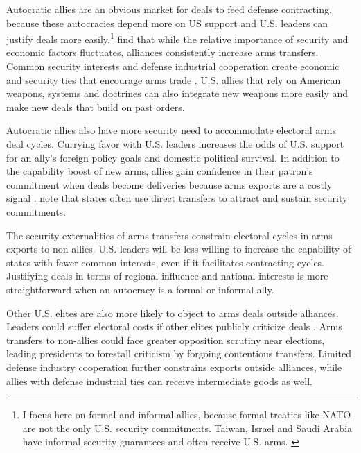 \documentclass[12pt]{article}
\begin{document}
Autocratic allies are an obvious market for deals to feed defense contracting, because these autocracies depend more on US support and U.S. leaders can justify deals more easily.\footnote{I focus here on formal and informal allies, because formal treaties like NATO are not the only U.S. security commitments. Taiwan, Israel and Saudi Arabia have informal security guarantees and often receive U.S. arms. \citep{Yarhi-Miloetal2016}}
\citet{Thurneretal2019} find that while the relative importance of security and economic factors fluctuates, alliances consistently increase arms transfers.
Common security interests and defense industrial cooperation create economic and security ties that encourage arms trade \citep{Bitzinger1994}. 
U.S. allies that rely on American weapons, systems and doctrines can also integrate new weapons more easily and make new deals that build on past orders. 


Autocratic allies also have more security need to accommodate electoral arms deal cycles. 
Currying favor with U.S. leaders increases the odds of U.S. support for an ally's foreign policy goals and domestic political survival.  
In addition to the capability boost of new arms, allies gain confidence in their patron's commitment when deals become deliveries because arms exports are a costly signal \citep{McManusYarhi-Milo2017}.
\citet[pg. 184-5]{IkenberryGrieco2003} note that states often use direct transfers to attract and sustain security commitments. 


The security externalities of arms transfers constrain electoral cycles in arms exports to non-allies. 
U.S. leaders will be less willing to increase the capability of states with fewer common interests, even if it facilitates contracting cycles.
Justifying deals in terms of regional influence and national interests is more straightforward when an autocracy is a formal or informal ally. 


Other U.S. elites are also more likely to object to arms deals outside alliances.
Leaders could suffer electoral costs if other elites publicly criticize deals \citep{Saunders2022}.
Arms transfers to non-allies could face greater opposition scrutiny near elections, leading presidents to forestall criticism by forgoing contentious transfers.
Limited defense industry cooperation further constrains exports outside alliances, while allies with defense industrial ties can receive intermediate goods as well.
\end{document}
